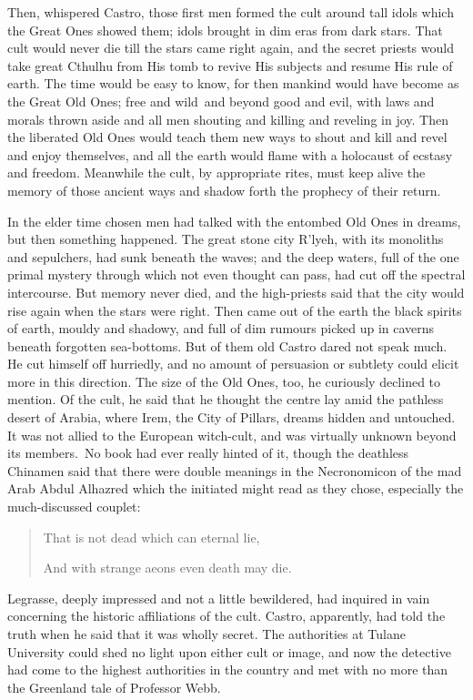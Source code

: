 Then, whispered Castro, those first men formed the cult around tall
idols which the Great Ones showed them; idols brought in dim eras from
dark stars. That cult would never die till the stars came right again,
and the secret priests would take great Cthulhu from His tomb to revive
His subjects and resume His rule of earth. The time would be easy to
know, for then mankind would have become as the Great Old Ones; free and
wild\est\ and beyond good and evil, with laws and morals thrown aside and all
men shouting and killing and reveling in joy. Then the liberated Old
Ones would teach them new ways to shout and kill and revel and enjoy
themselves, and all the earth would flame with a holocaust of ecstasy
and freedom. Meanwhile the cult, by appropriate rites, must keep alive
the memory of those ancient ways and shadow forth the prophecy of their
return.

In the elder time chosen men had talked with the entombed Old Ones in
dreams, but then something happened. The great stone city R'lyeh, with
its monoliths and sepulchers, had sunk beneath the waves; and the deep
waters, full of the one primal mystery through which not even thought
can pass, had cut off the spectral intercourse. But memory never died,
and the high-priests said that the city would rise again when the stars
were right. Then came out of the earth the black spirits of earth,
mouldy and shadowy, and full of dim rumours picked up in caverns beneath
forgotten sea-bottoms. But of them old Castro dared not speak much. He
cut himself off hurriedly, and no amount of persuasion or subtlety could
elicit more in this direction. The size of the Old Ones, too, he
curiously declined to mention. Of the cult, he said that he thought the
centre lay amid the pathless desert of Arabia, where Irem, the City of
Pillars, dreams hidden and untouched. It was not allied to the European
witch-cult, and was virtually unknown beyond its members.\est\ No book had
ever really hinted of it, though the deathless Chinamen said that there
were double meanings in the Necronomicon of the mad Arab Abdul Alhazred
which the initiated might read as they chose, especially the
much-discussed couplet:

\begin{quote}
\forceindent{}That is not dead which can eternal lie,

And with strange aeons even death may die.
\end{quote}

Legrasse, deeply impressed and not a little bewildered, had inquired in
vain concerning the historic affiliations of the cult. Castro,
apparently, had told the truth when he said that it was wholly secret.
The authorities at Tulane University could shed no light upon either
cult or image, and now the detective had come to the highest authorities
in the country and met with no more than the Greenland tale of Professor
Webb.

